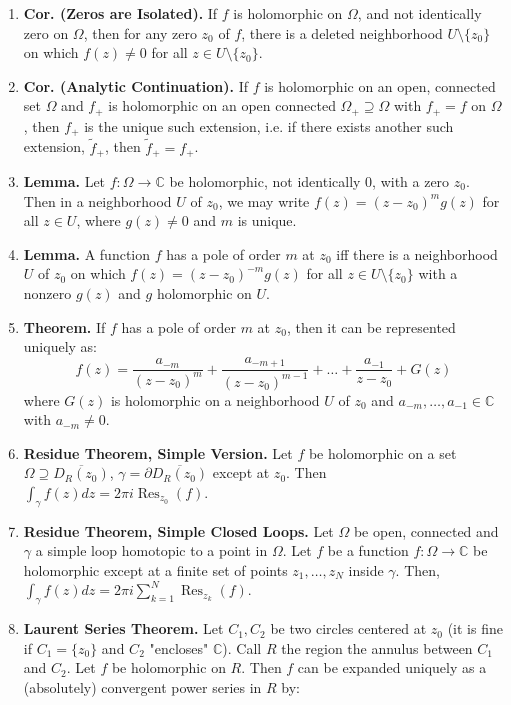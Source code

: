 \documentclass[12pt]{article}
\theoremstyle{definition}
\theoremstyle{named}
\DeclareMathOperator{\Res}{Res}
\begin{document}
{\begin{multicols}{2}
\begin{spacing}{1.01}
\begin{enumerate}
    \item \textbf{Cor. (Zeros are Isolated). } If $f$ is holomorphic on $\Omega$, and not identically zero on $\Omega$, then for any zero $z_0$ of $f$, there is a deleted neighborhood $U \setminus \{z_0\}$ on which $f(z) \neq 0$ for all $z \in U \setminus \{z_0\}$. 
    \item \textbf{Cor. (Analytic Continuation). } If $f$ is holomorphic on an open, connected set $\Omega$ and $f_+$ is holomorphic on an open connected $\Omega_+ \supseteq \Omega$ with $f_+ = f$ on $\Omega$, then $f_+$ is the unique such extension, i.e. if there exists another such extension, $\tilde{f}_+$, then $\tilde{f}_+ = f_+$. 
    \item \textbf{Lemma. } Let $f: \Omega \to \mathbb{C}$ be holomorphic, not identically 0, with a zero $z_0$. Then in a neighborhood $U$ of $z_0$, we may write $f(z) = (z-z_0)^mg(z)$ for all $z \in U$, where $g(z) \neq 0$ and $m$ is unique. 
    \item \textbf{Lemma. } A function $f$ has a pole of order $m$ at $z_0$ iff there is a neighborhood $U$ of $z_0$ on which $f(z) = (z-z_0)^{-m}g(z)$ for all $z \in U \setminus \{z_0\}$ with a nonzero $g(z)$ and $g$ holomorphic on $U$. 
    \item \textbf{Theorem. } If $f$ has a pole of order $m$ at $z_0$, then it can be represented uniquely as: 
    $$
    f(z) = \frac{a_{-m}}{(z-z_0)^m} + \frac{a_{-m+1}}{(z-z_0)^{m-1}} + \dots + \frac{a_{-1}}{z-z_0} + G(z)
    $$ where $G(z)$ is holomorphic on a neighborhood $U$ of $z_0$ and $a_{-m}, \dots, a_{-1} \in \mathbb{C}$ with $a_{-m} \neq 0$. 
    \item \textbf{Residue Theorem, Simple Version. } Let $f$ be holomorphic on a set $\Omega \supseteq \overline{D_R(z_0)}$, $\gamma = \partial \overline{D_R(z_0)}$ except at $z_0$. Then $\int_\gamma f(z) dz = 2\pi i \Res_{z_0}(f)$. 
    \item \textbf{Residue Theorem, Simple Closed Loops. } Let $\Omega$ be open, connected and $\gamma$ a simple loop homotopic to a point in $\Omega$. Let $f$ be a function $f: \Omega \to \mathbb{C}$ be holomorphic except at a finite set of points $z_1, \dots, z_N$ inside $\gamma$. Then, $\int_\gamma f(z) dz = 2\pi i \sum_{k=1}^{N}\Res_{z_k}(f)$. 
    \item \textbf{Laurent Series Theorem. } Let $C_1, C_2$ be two circles centered at $z_0$ (it is fine if $C_1 = \{z_0\}$ and $C_2$ "encloses" $\mathbb{C}$). Call $R$ the region the annulus between $C_1$ and $C_2$. Let $f$ be holomorphic on $R$. Then $f$ can be expanded uniquely as a (absolutely) convergent power series in $R$ by: 

\end{enumerate}
\end{spacing}
\end{multicols}}
\end{document}
